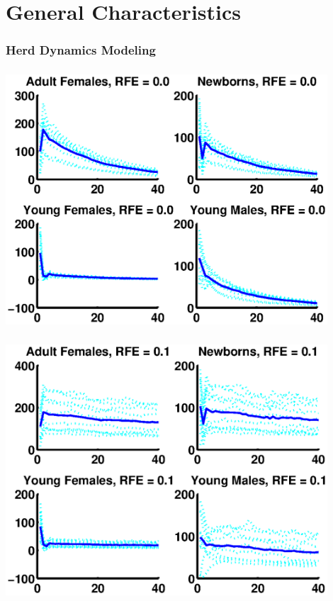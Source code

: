 \documentclass[mathserif]{beamer}
\begin{document}
\section{General Characteristics}

\begin{frame}
  \frametitle{Herd Dynamics Modeling}
  \tableofcontents[currentsection]
\end{frame}

\begin{frame}
  \begin{center}
    \frametitle{\insertsection}
    \includegraphics[width=0.9\textwidth]{general0}
  \end{center}
\end{frame}

\begin{frame}
  \begin{center}
    \frametitle{\insertsection}
    \includegraphics[width=0.9\textwidth]{general1}
  \end{center}
\end{frame}
\end{document}
